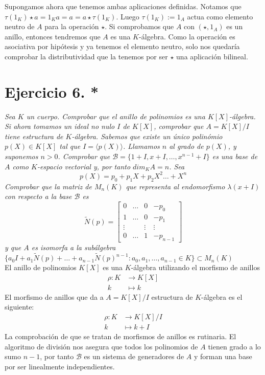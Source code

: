 \documentclass[UTF8]{article}
\begin{document}
Supongamos ahora que tenemos ambas aplicaciones definidas. Notamos
que \(\tau(1_K)\star a = 1_Ka = a = a\star
\tau(1_K)\). Luego \(\tau(1_K) := 1_A\) actua como elemento
neutro de \(A\) para la operación \(\star\). Si comprobamos que \(A\) con
\((\star, 1_A)\) es un anillo, entonces tendremos que \(A\) es una
\(K\)-álgebra. Como la operación es asociativa por hipótesis y ya tenemos el
elemento neutro, solo nos quedaría comprobar la distributividad que la tenemos
por ser \(\star\) una aplicación bilineal.

\section{Ejercicio 6. *} \emph{Sea \(K\) un cuerpo. Comprobar que el anillo de polinomios
es una \(K[X]\)-álgebra. Si ahora tomamos un ideal no nulo \(I\) de
\(K[X]\), comprobar que \(A = K[X]/I\) tiene estructura de
\(K\)-álgebra. Sabemos que existe un único polinómio \(p(X) \in K[X]\) tal que
\(I = \langle p(X) \rangle\). Llamamos \(n\) al grado de \(p(X)\), y suponemos
\(n > 0\). Comprobar que \(\mathcal{B} = \{1 + I, x + I, \dots, x^{n-1} + I\}\)
es una base de \(A\) como \(K\)-espacio vectorial y, por tanto \(dim_KA = n\).
Sea}
\[
p(X) = p_0 + p_1X + p_2X^2\dots + X^n
\]
\emph{Comprobar que la matriz de \(M_n(K)\) que representa al endomorfismo \(\lambda(x
+ I)\) con respecto a la base \(\mathcal{B}\) es}
\[
\tilde{N}(p) = \begin{bmatrix}
    0       &  \dots  & 0 & -p_0 \\
    1       &  \dots  & 0 & -p_1 \\
    \vdots &  & \vdots & \vdots \\
    0       &  \dots  & 1 & -p_{n-1}
\end{bmatrix}
\]
\emph{y que \(A\) es isomorfa a la subálgebra \(\{a_0I + a_1\tilde{N}(p) + \dots +
  a_{n-1}\tilde{N}(p)^{n-1} : a_0, a_1, \dots, a_{n-1} \in K\} \subset M_n(K)\)}\\

El anillo de polinomios \(K[X]\) es una \(K\)-álgebra utilizando el morfismo de
anillos
\[
\begin{aligned}
  \rho: K &\to K[X]\\
        k &\mapsto k
\end{aligned}
\]
El morfismo de anillos que da a \(A = K[X]/I\) estructura de \(K\)-álgebra es el
siguiente:
\[
\begin{aligned}
  \rho: K &\to K[X]/I \\
  k &\mapsto k + I
\end{aligned}
\]
La comprobación de que se tratan de morfismos de anillos es rutinaria.
El algoritmo de división nos asegura que todos los polinomios de \(A\) tienen
grado a lo sumo \(n-1\), por tanto \(\mathcal{B}\) es un sistema de generadores
de \(A\) y forman una base por ser linealmente independientes.
\end{document}
